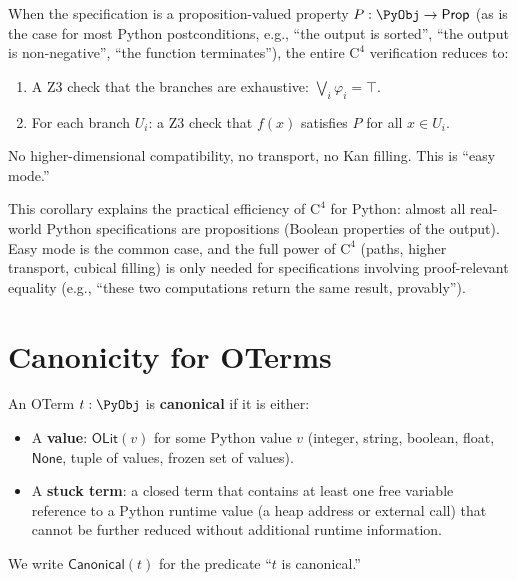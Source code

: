 \begin{corollary}
\label{cor:easy-mode}
When the specification is a proposition-valued property
$P : \PyObj \to \mathsf{Prop}$ (as is the case for most Python
postconditions, e.g., ``the output is sorted'', ``the output is
non-negative'', ``the function terminates''), the entire
$\mathrm{C}^4$ verification reduces to:
\begin{enumerate}
\item A Z3 check that the branches are exhaustive: $\bigvee_i \varphi_i = \top$.
\item For each branch $U_i$: a Z3 check that $f(x)$ satisfies $P$ for
  all $x \in U_i$.
\end{enumerate}
No higher-dimensional compatibility, no transport, no Kan filling.
This is ``easy mode.''
\end{corollary}

\begin{remark}
This corollary explains the practical efficiency of $\mathrm{C}^4$ for
Python: almost all real-world Python specifications are propositions
(Boolean properties of the output).  Easy mode is the common case,
and the full power of $\mathrm{C}^4$ (paths, higher transport, cubical
filling) is only needed for specifications involving proof-relevant
equality (e.g., ``these two computations return the same result,
provably'').
\end{remark}


\section{Canonicity for OTerms}
\label{sec:canonicity}

\begin{definition}
\label{def:canonical-oterm}
An OTerm $t : \PyObj$ is \textbf{canonical} if it is either:
\begin{itemize}
\item A \textbf{value}: $\mathsf{OLit}(v)$ for some Python value $v$
  (integer, string, boolean, float, $\mathsf{None}$, tuple of values,
  frozen set of values).
\item A \textbf{stuck term}: a closed term that contains at least one
  free variable reference to a Python runtime value (a heap address or
  external call) that cannot be further reduced without additional
  runtime information.
\end{itemize}
We write $\mathsf{Canonical}(t)$ for the predicate ``$t$ is canonical.''
\end{definition}

